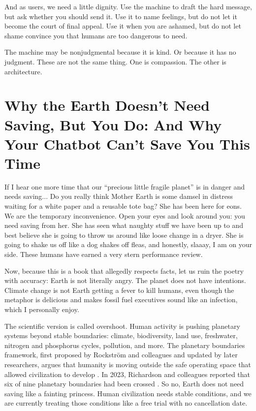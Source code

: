 \documentclass[12pt,oneside]{book}
\begin{document}
And as users, we need a little dignity. Use the machine to draft the hard message, but ask whether you should send it. Use it to name feelings, but do not let it become the court of final appeal. Use it when you are ashamed, but do not let shame convince you that humans are too dangerous to need.

The machine may be nonjudgmental because it is kind. Or because it has no judgment. These are not the same thing. One is compassion. The other is architecture.

\chapter{Why the Earth Doesn't Need Saving, But You Do: And Why Your Chatbot Can't Save You This Time}

If I hear one more time that our ``precious little fragile planet'' is in danger and needs saving... Do you really think Mother Earth is some damsel in distress waiting for a white paper and a reusable tote bag? She has been here for eons. We are the temporary inconvenience. Open your eyes and look around you: you need saving from her. She has seen what naughty stuff we have been up to and best believe she is going to throw us around like loose change in a dryer. She is going to shake us off like a dog shakes off fleas, and honestly, slaaay, I am on your side. These humans have earned a very stern performance review.

Now, because this is a book that allegedly respects facts, let us ruin the poetry with accuracy: Earth is not literally angry. The planet does not have intentions. Climate change is not Earth getting a fever to kill humans, even though the metaphor is delicious and makes fossil fuel executives sound like an infection, which I personally enjoy.

The scientific version is called overshoot. Human activity is pushing planetary systems beyond stable boundaries: climate, biodiversity, land use, freshwater, nitrogen and phosphorus cycles, pollution, and more. The planetary boundaries framework, first proposed by Rockstr\"om and colleagues and updated by later researchers, argues that humanity is moving outside the safe operating space that allowed civilization to develop \parencite{rockstrom2009,steffen2015}. In 2023, Richardson and colleagues reported that six of nine planetary boundaries had been crossed \parencite{richardson2023}. So no, Earth does not need saving like a fainting princess. Human civilization needs stable conditions, and we are currently treating those conditions like a free trial with no cancellation date.
\end{document}

